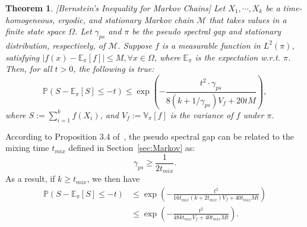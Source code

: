 \documentclass{article}
\theoremstyle{plain}
\newtheorem{theorem}{Theorem}[section]
\theoremstyle{definition}
\newcommand{\E}{\mathbb{E}}
\renewcommand{\P}{\mathbb{P}}
\newcommand{\V}{\mathbb{V}}
\newcommand{\cM}{\mathcal{M}}
\newcommand{\bracket}[1]{\left[ #1\right]}
\newcommand{\paren}[1]{\left( #1\right)}
\begin{document}
\begin{theorem}\citep[Theorem 3.4]{paulin2015concentration} [Bernstein's Inequality for Markov Chains] Let $X_1, \cdots, X_k$ be a time-homogeneous, ergodic, and stationary Markov chain $\cM$ that takes values in a finite state space $\Omega$. Let $\gamma_{ps}$ and $\pi$ be the pseudo spectral gap and stationary distribution, respectively, of $\cM$. Suppose $f$ is a measurable function in $L^2(\pi)$, satisfying $|f(x)-\E_\pi[f]|\leq M, \forall x \in \Omega$, where $\E_\pi$ is the expectation w.r.t. $\pi$. Then, for all $t>0$, the following is true: 
\begin{equation}
    \P\paren{S-\E_\pi[S]\leq -t}\leq \exp\paren{-\frac{t^2\cdot\gamma_{ps}}{8\paren{k+1/\gamma_{ps}}V_f+20tM}},
\end{equation}
where $S:=\sum_{i=1}^kf(X_i)$, and $V_f:=\V_\pi\bracket{f}$ is the variance of $f$ under $\pi$.
\label{thm:BernMC}
\end{theorem}

According to Proposition 3.4 of~\citet{paulin2015concentration}, the pseudo spectral gap can be related to the mixing time $t_{mix}$ defined in Section~\ref{sec:Markov} as:
\begin{equation}
    \gamma_{ps}\geq \frac{1}{2t_{mix}}.
\end{equation}
As a result, if $k\geq t_{mix}$, we then have
\begin{equation}
\begin{aligned}
    \P\paren{S-\E_\pi[S]\leq -t}&\leq \exp\paren{-\frac{t^2}{16t_{mix}\paren{k+2t_{mix}}V_f+40t_{mix}Mt}}\\
    &\leq \exp\paren{-\frac{t^2}{48kt_{mix}V_f+40t_{mix}Mt}}.\label{eqn:bernstein_markov}
\end{aligned}
\end{equation}
\end{document}

